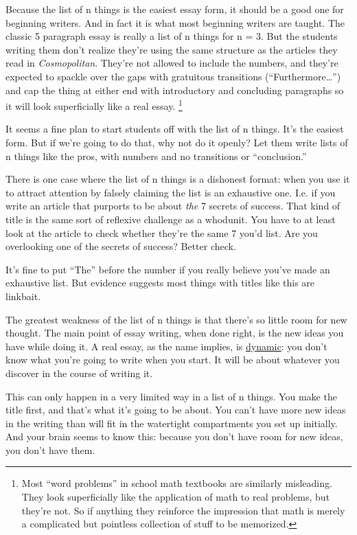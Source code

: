 \documentclass[12pt]{book}
\begin{document}
Because the list of n things is the easiest essay form, it should be a
good one for beginning writers. And in fact it is what most beginning
writers are taught. The classic 5 paragraph essay is really a list of n
things for n = 3. But the students writing them don't realize they're
using the same structure as the articles they read in
\emph{Cosmopolitan}. They're not allowed to include the numbers, and
they're expected to spackle over the gaps with gratuitous transitions
(``Furthermore\ldots{}'') and cap the thing at either end with
introductory and concluding paragraphs so it will look superficially
like a real essay. \footnote{Most ``word problems'' in school math textbooks are similarly
misleading. They look superficially like the application of math to real
problems, but they're not. So if anything they reinforce the impression
that math is merely a complicated but pointless collection of stuff to
be memorized.}

It seems a fine plan to start students off with the list of n things.
It's the easiest form. But if we're going to do that, why not do it
openly? Let them write lists of n things like the pros, with numbers and
no transitions or ``conclusion.''

There is one case where the list of n things is a dishonest format: when
you use it to attract attention by falsely claiming the list is an
exhaustive one. I.e. if you write an article that purports to be about
\emph{the} 7 secrets of success. That kind of title is the same sort of
reflexive challenge as a whodunit. You have to at least look at the
article to check whether they're the same 7 you'd list. Are you
overlooking one of the secrets of success? Better check.

It's fine to put ``The'' before the number if you really believe you've
made an exhaustive list. But evidence suggests most things with titles
like this are linkbait.

The greatest weakness of the list of n things is that there's so little
room for new thought. The main point of essay writing, when done right,
is the new ideas you have while doing it. A real essay, as the name
implies, is \href{essay.html}{dynamic}: you don't know what you're going
to write when you start. It will be about whatever you discover in the
course of writing it.

This can only happen in a very limited way in a list of n things. You
make the title first, and that's what it's going to be about. You can't
have more new ideas in the writing than will fit in the watertight
compartments you set up initially. And your brain seems to know this:
because you don't have room for new ideas, you don't have them.
\end{document}
